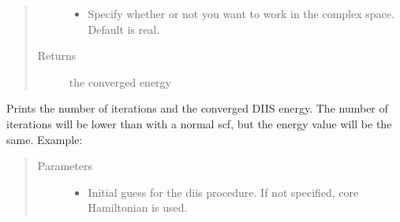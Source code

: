 \documentclass[letterpaper,10pt,english]{sphinxmanual}
\begin{document}
\begin{fulllineitems}
\begin{fulllineitems}
\begin{quote}
\begin{description}
\begin{itemize}
\item {} 
 \textendash{} Specify whether or not you want to work in the complex space. Default is real.

\end{itemize}

\item[{Returns}] \leavevmode
the converged energy

\end{description}\end{quote}

\end{fulllineitems}


\begin{fulllineitems}
\label{\detokenize{RHF:hf.HartreeFock.RHF.MF.get_scf_solution_diis}}
Prints the number of iterations and the converged DIIS energy. The number of iterations will be lower than with
a normal scf, but the energy value will be the same. Example:

\begin{sphinxVerbatim}[commandchars=\\\{\}]
   
       
   
\end{sphinxVerbatim}
\begin{quote}\begin{description}
\item[{Parameters}] \leavevmode\begin{itemize}
\item {} 
 \textendash{} Initial guess for the diis procedure. If not specified, core Hamiltonian is used.


\end{itemize}
\end{description}
\end{quote}
\end{fulllineitems}
\end{fulllineitems}
\end{document}
